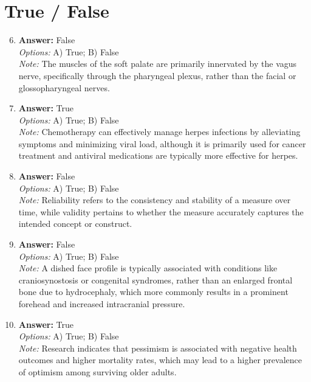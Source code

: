 \documentclass[12pt]{article}
\begin{document}
\section*{True / False}
\begin{enumerate}[label=\arabic*.]
\setcounter{enumi}{5}
\item \textbf{Answer:} False
\\ \textit{Options:} A) True; B) False
\\ \textit{Note:} The muscles of the soft palate are primarily innervated by the vagus nerve, specifically through the pharyngeal plexus, rather than the facial or glossopharyngeal nerves.
\item \textbf{Answer:} True
\\ \textit{Options:} A) True; B) False
\\ \textit{Note:} Chemotherapy can effectively manage herpes infections by alleviating symptoms and minimizing viral load, although it is primarily used for cancer treatment and antiviral medications are typically more effective for herpes.
\item \textbf{Answer:} False
\\ \textit{Options:} A) True; B) False
\\ \textit{Note:} Reliability refers to the consistency and stability of a measure over time, while validity pertains to whether the measure accurately captures the intended concept or construct.
\item \textbf{Answer:} False
\\ \textit{Options:} A) True; B) False
\\ \textit{Note:} A dished face profile is typically associated with conditions like craniosynostosis or congenital syndromes, rather than an enlarged frontal bone due to hydrocephaly, which more commonly results in a prominent forehead and increased intracranial pressure.
\item \textbf{Answer:} True
\\ \textit{Options:} A) True; B) False
\\ \textit{Note:} Research indicates that pessimism is associated with negative health outcomes and higher mortality rates, which may lead to a higher prevalence of optimism among surviving older adults.
\end{enumerate}
\end{document}
